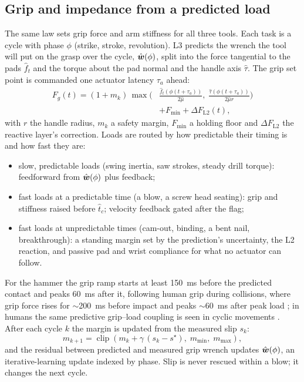 \subsection{Grip and impedance from a predicted load}
\label{sec:grip}
The same law sets grip force and arm stiffness for all three tools. Each task is a cycle with phase $\phi$
(strike, stroke, revolution). L3 predicts the wrench the tool will put on the grasp over the cycle,
$\hat{\boldsymbol{w}}(\phi)$, split into the force tangential to the pads $\hat f_t$ and the torque about the pad normal
and the handle axis $\hat\tau$. The grip set point is commanded one actuator latency $\tau_a$ ahead:
\begin{equation}
  \begin{aligned}
  F_g(t) = (1+m_k)\,\max\!\Big(&\frac{\hat f_t(\phi(t+\tau_a))}{2\hat\mu},\;
                                  \frac{\hat\tau(\phi(t+\tau_a))}{2\hat\mu r}\Big)\\
         &+ F_{\min} + \Delta F_{\mathrm{L2}}(t),
  \end{aligned}
  \label{eq:grip}
\end{equation}
with $r$ the handle radius, $m_k$ a safety margin, $F_{\min}$ a holding floor and $\Delta F_{\mathrm{L2}}$ the
reactive layer's correction. Loads are routed by how predictable their timing is and how fast they are:
\begin{itemize}
  \item slow, predictable loads (swing inertia, saw strokes, steady drill torque): feedforward from
    $\hat{\boldsymbol{w}}(\phi)$ plus feedback;
  \item fast loads at a predictable time (a blow, a screw head seating): grip and stiffness raised before
    $\hat t_c$; velocity feedback gated after the flag;
  \item fast loads at unpredictable times (cam-out, binding, a bent nail, breakthrough): a standing margin set by
    the prediction's uncertainty, the L2 reaction, and passive pad and wrist compliance for what no actuator can
    follow.
\end{itemize}
For the hammer the grip ramp starts at least \SI{150}{\milli\second} before the predicted contact and peaks
\SI{60}{\milli\second} after it, following human grip during collisions, where grip force rises for
$\sim$\SI{200}{\milli\second} before impact and peaks $\sim$\SI{60}{\milli\second} after peak load
\cite{johansson1988programmed,turrell1999grip,white2011grip}; in humans the same predictive grip--load coupling is
seen in cyclic movements \cite{flanagan1993modulation}. After each cycle $k$ the margin is updated from the measured
slip $s_k$:
\begin{equation}
  m_{k+1} = \operatorname{clip}\!\left(m_k + \gamma\,(s_k - s^\star),\; m_{\min},\; m_{\max}\right),
\end{equation}
and the residual between predicted and measured grip wrench updates $\hat{\boldsymbol{w}}(\phi)$, an iterative-learning
update indexed by phase. Slip is never rescued within a blow; it changes the next cycle.

